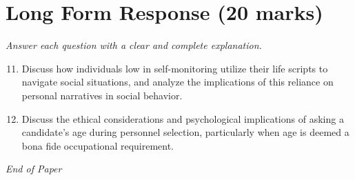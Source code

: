 \documentclass[12pt]{article}
\begin{document}
\section*{Long Form Response (20 marks)}
\textit{Answer each question with a clear and complete explanation.}
\begin{enumerate}[label=\arabic*.]
\setcounter{enumi}{10}
\item Discuss how individuals low in self-monitoring utilize their life scripts to navigate social situations, and analyze the implications of this reliance on personal narratives in social behavior.
\item Discuss the ethical considerations and psychological implications of asking a candidate's age during personnel selection, particularly when age is deemed a bona fide occupational requirement.
\end{enumerate}

\vfill
\noindent\textit{End of Paper}
\end{document}
